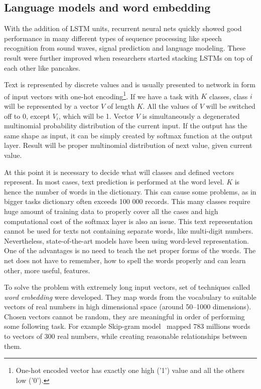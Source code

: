 		\subsection{Language models and word embedding}\label{subsec:lmAndEmbedd}

With the addition of LSTM units, recurrent neural nets quickly showed good performance in many different types of sequence processing like speech recognition from sound waves, signal prediction and language modeling. These result were further improved when researchers started stacking LSTMs on top of each other like pancakes.

Text is represented by discrete values and is usually presented to network in form of input vectors with one-hot encoding\footnote{One-hot encoded vector has exactly one high ('1') value and all the others low ('0').}. If we have a task with $ K $ classes, class $ i $ will be represented by a vector $ V $ of length $ K $. All the values of $ V $ will be switched off to 0, except $ V_i $, which will be 1. Vector $ V $ is simultaneously a degenerated multinomial probability distribution of the current input. If the output has the same shape as input, it can be simply created by softmax function at the output layer. Result will be proper multinomial distribution of next value, given current value.

At this point it is necessary to decide what will classes and defined vectors represent. In most cases, text prediction is performed at the word level. $ K $ is hence the number of words in the dictionary. This can cause some problems, as in bigger tasks dictionary often exceeds 100 000 records. This many classes require huge amount of training data to properly cover all the cases and high computational cost of the softmax layer is also an issue. This text representation cannot be used for texts not containing separate words, like multi-digit numbers. Nevertheless, state-of-the-art models have been using word-level representation. One of the advantages is no need to teach the net proper forms of the words. The net does not have to remember, how to spell the words properly and can learn other, more useful, features.

To solve the problem with extremely long input vectors, set of techniques called \emph{word embedding} were developed. They map words from the vocabulary to suitable vectors of real numbers in high dimensional space (around 50--1000 dimensions). Chosen vectors cannot be random, they are meaningful in order of performing some following task. For example Skip-gram model~\cite{DBLP:journals/corr/abs-1301-3781} mapped 783 millions words to vectors of 300 real numbers, while creating reasonable relationships between them.

